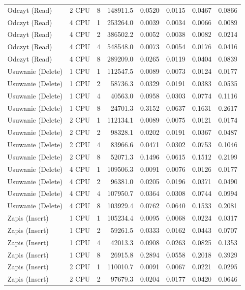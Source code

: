 \begin{table}[ht]
{\begin{tabular}{llcrrrrr}
Odczyt (Read) & 2 CPU & 8 & 148911.5 & 0.0520 & 0.0115 & 0.0467 & 0.0866 \\
Odczyt (Read) & 4 CPU & 1 & 253264.0 & 0.0039 & 0.0034 & 0.0066 & 0.0089 \\
Odczyt (Read) & 4 CPU & 2 & 386502.2 & 0.0052 & 0.0038 & 0.0082 & 0.0214 \\
Odczyt (Read) & 4 CPU & 4 & 548548.0 & 0.0073 & 0.0054 & 0.0176 & 0.0416 \\
Odczyt (Read) & 4 CPU & 8 & 289209.0 & 0.0265 & 0.0119 & 0.0404 & 0.0839 \\
Usuwanie (Delete) & 1 CPU & 1 & 112547.5 & 0.0089 & 0.0073 & 0.0124 & 0.0177 \\
Usuwanie (Delete) & 1 CPU & 2 & 58736.3 & 0.0329 & 0.0191 & 0.0383 & 0.0535 \\
Usuwanie (Delete) & 1 CPU & 4 & 40563.0 & 0.0958 & 0.0303 & 0.0774 & 0.1116 \\
Usuwanie (Delete) & 1 CPU & 8 & 24701.3 & 0.3152 & 0.0637 & 0.1631 & 0.2617 \\
Usuwanie (Delete) & 2 CPU & 1 & 112134.1 & 0.0089 & 0.0075 & 0.0121 & 0.0174 \\
Usuwanie (Delete) & 2 CPU & 2 & 98328.1 & 0.0202 & 0.0191 & 0.0367 & 0.0487 \\
Usuwanie (Delete) & 2 CPU & 4 & 83966.6 & 0.0471 & 0.0302 & 0.0753 & 0.1046 \\
Usuwanie (Delete) & 2 CPU & 8 & 52071.3 & 0.1496 & 0.0615 & 0.1512 & 0.2199 \\
Usuwanie (Delete) & 4 CPU & 1 & 109506.3 & 0.0091 & 0.0076 & 0.0126 & 0.0177 \\
Usuwanie (Delete) & 4 CPU & 2 & 96381.0 & 0.0205 & 0.0196 & 0.0371 & 0.0490 \\
Usuwanie (Delete) & 4 CPU & 4 & 107950.7 & 0.0364 & 0.0308 & 0.0744 & 0.0994 \\
Usuwanie (Delete) & 4 CPU & 8 & 103929.4 & 0.0762 & 0.0640 & 0.1533 & 0.2081 \\
Zapis (Insert) & 1 CPU & 1 & 105234.4 & 0.0095 & 0.0068 & 0.0224 & 0.0317 \\
Zapis (Insert) & 1 CPU & 2 & 59261.5 & 0.0333 & 0.0162 & 0.0443 & 0.0707 \\
Zapis (Insert) & 1 CPU & 4 & 42013.3 & 0.0908 & 0.0263 & 0.0825 & 0.1353 \\
Zapis (Insert) & 1 CPU & 8 & 26915.8 & 0.2894 & 0.0558 & 0.2018 & 0.3929 \\
Zapis (Insert) & 2 CPU & 1 & 110010.7 & 0.0091 & 0.0067 & 0.0221 & 0.0295 \\
Zapis (Insert) & 2 CPU & 2 & 97679.3 & 0.0204 & 0.0177 & 0.0420 & 0.0646 \\

\end{tabular}}
\end{table}
